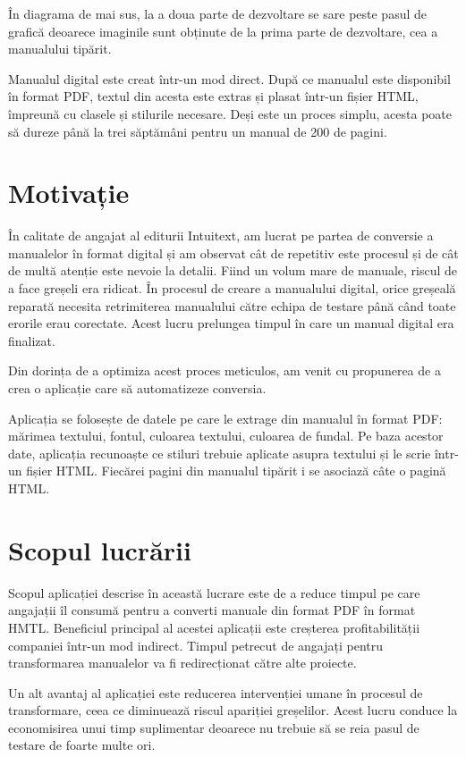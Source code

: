 În diagrama de mai sus, la a doua parte de dezvoltare se sare peste pasul de grafică deoarece imaginile sunt obținute de la prima parte de dezvoltare, cea a manualului tipărit.

Manualul digital este creat într-un mod direct. După ce manualul este disponibil în format PDF, textul din acesta este extras și plasat într-un fișier HTML, împreună cu clasele și stilurile necesare. Deși este un proces simplu, acesta poate să dureze până la trei săptămâni pentru un manual de 200 de pagini. 


\section{Motivație}

În calitate de angajat al editurii Intuitext, am lucrat pe partea de conversie a manualelor în format digital și am observat cât de repetitiv este procesul și de cât de multă atenție este nevoie la detalii. Fiind un volum mare de manuale, riscul de a face greșeli era ridicat. În procesul de creare a manualului digital, orice greșeală reparată necesita retrimiterea manualului către echipa de testare până când toate erorile erau corectate. Acest lucru prelungea timpul în care un manual digital era finalizat.

Din dorința de a optimiza acest proces meticulos, am venit cu propunerea de a crea o aplicație care să automatizeze conversia.

Aplicația se folosește de datele pe care le extrage din manualul în format PDF: mărimea textului, fontul, culoarea textului, culoarea de fundal. Pe baza acestor date, aplicația recunoaște ce stiluri trebuie aplicate asupra textului și le scrie într-un fișier HTML. Fiecărei pagini din manualul tipărit i se asociază câte o pagină HTML.


\section{Scopul lucrării}

Scopul aplicației descrise în această lucrare este de a reduce timpul pe care angajații îl consumă pentru a converti manuale din format PDF în format HMTL. Beneficiul principal al acestei aplicații este creșterea profitabilității companiei într-un mod indirect. Timpul petrecut de angajați pentru transformarea manualelor va fi redirecționat către alte proiecte.

Un alt avantaj al aplicației este reducerea intervenției umane în procesul de transformare, ceea ce diminuează riscul apariției greșelilor. Acest lucru conduce la economisirea unui timp suplimentar deoarece nu trebuie să se reia pasul de testare de foarte multe ori.

